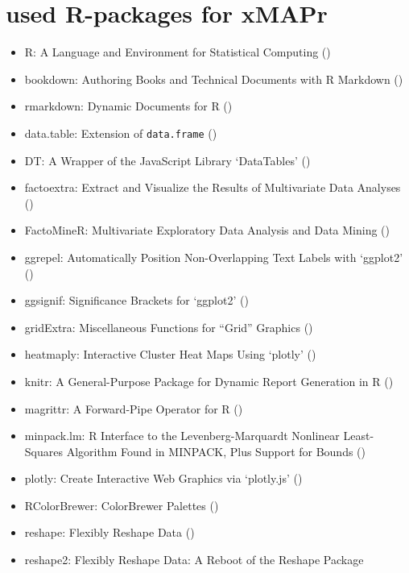 \documentclass[]{book}
\providecommand{\tightlist}{%
  \setlength{\itemsep}{0pt}\setlength{\parskip}{0pt}}
\theoremstyle{definition}
\theoremstyle{definition}
\theoremstyle{definition}
\theoremstyle{remark}
\begin{document}
\chapter{used R-packages for xMAPr}\label{used-r-packages-for-xmapr}

\begin{itemize}
\tightlist
\item
  R: A Language and Environment for Statistical Computing
  (\citet{R-base})
\item
  bookdown: Authoring Books and Technical Documents with R Markdown
  (\citet{R-bookdown})
\item
  rmarkdown: Dynamic Documents for R (\citet{R-rmarkdown})
\item
  data.table: Extension of \texttt{data.frame} (\citet{R-data.table})
\item
  DT: A Wrapper of the JavaScript Library `DataTables' (\citet{R-DT})
\item
  factoextra: Extract and Visualize the Results of Multivariate Data
  Analyses (\citet{R-factoextra})
\item
  FactoMineR: Multivariate Exploratory Data Analysis and Data Mining
  (\citet{R-FactoMineR})
\item
  ggrepel: Automatically Position Non-Overlapping Text Labels with
  `ggplot2' (\citet{R-ggrepel})
\item
  ggsignif: Significance Brackets for `ggplot2' (\citet{R-ggsignif})
\item
  gridExtra: Miscellaneous Functions for ``Grid'' Graphics
  (\citet{R-gridExtra})
\item
  heatmaply: Interactive Cluster Heat Maps Using `plotly'
  (\citet{R-heatmaply})
\item
  knitr: A General-Purpose Package for Dynamic Report Generation in R
  (\citet{R-knitr})
\item
  magrittr: A Forward-Pipe Operator for R (\citet{R-magrittr})
\item
  minpack.lm: R Interface to the Levenberg-Marquardt Nonlinear
  Least-Squares Algorithm Found in MINPACK, Plus Support for Bounds
  (\citet{R-minpack.lm})
\item
  plotly: Create Interactive Web Graphics via `plotly.js'
  (\citet{R-plotly})
\item
  RColorBrewer: ColorBrewer Palettes (\citet{R-RColorBrewer})
\item
  reshape: Flexibly Reshape Data (\citet{R-reshape})
\item
  reshape2: Flexibly Reshape Data: A Reboot of the Reshape Package

\end{itemize}
\end{document}
